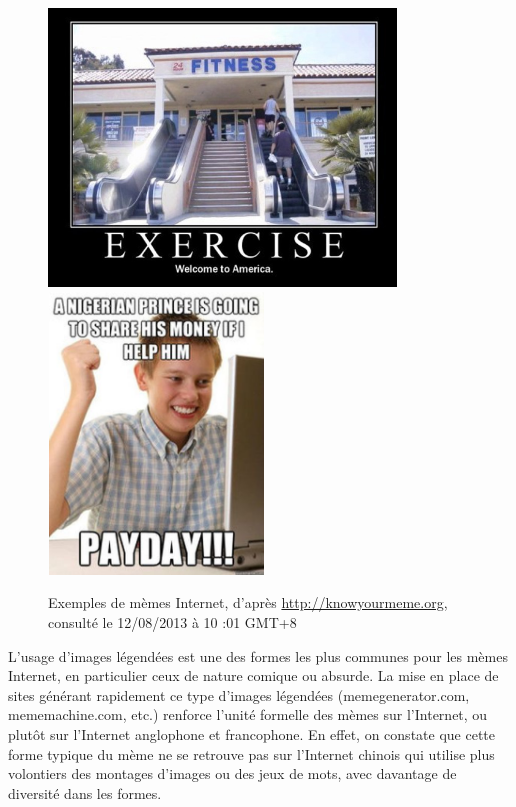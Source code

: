 \begin{figure}[h]
    \centering
    \includegraphics[width=3.6335in,height=2.9114in]{figures/chap2/chapitre2-img3.jpg}
    \includegraphics[width=2.2559in,height=2.9449in]{figures/chap2/chapitre2-img4.jpg}
    \caption[Exemples de mèmes internet]{Exemples de mèmes Internet, d{\textquoteright}après \url{http://knowyourmeme.org}, consulté le 12/08/2013 à 10 :01 GMT+8}
    \label{fig:memes-examples}
\end{figure}

L{\textquoteright}usage d{\textquoteright}images légendées est une des formes les plus communes pour les mèmes Internet, en particulier ceux de nature comique ou absurde. La mise en place de sites générant rapidement ce type d{\textquoteright}images légendées (memegenerator.com, mememachine.com, etc.) renforce l{\textquoteright}unité formelle des mèmes sur l{\textquoteright}Internet, ou plutôt sur l{\textquoteright}Internet anglophone et francophone. En effet, on constate que cette forme typique du mème ne se retrouve pas sur l{\textquoteright}Internet chinois qui utilise plus volontiers des montages d{\textquoteright}images ou des jeux de mots, avec davantage de diversité dans les formes.

